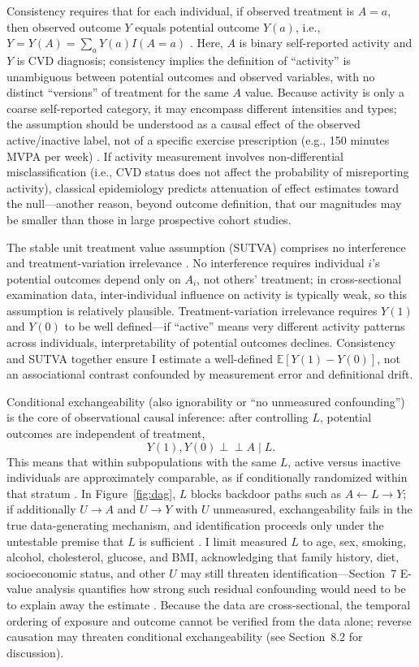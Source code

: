 \documentclass[12pt,a4paper]{article}
\newcommand{\E}{\mathbb{E}}
\newcommand{\indep}{\perp\!\!\!\perp}
\begin{document}
Consistency requires that for each individual, if observed treatment is $A=a$, then observed outcome $Y$ equals potential outcome $Y(a)$, i.e., $Y=Y(A)=\sum_a Y(a)I(A=a)$ \cite{hernan2024whatif}. Here, $A$ is binary self-reported activity and $Y$ is CVD diagnosis; consistency implies the definition of ``activity'' is unambiguous between potential outcomes and observed variables, with no distinct ``versions'' of treatment for the same $A$ value. Because activity is only a coarse self-reported category, it may encompass different intensities and types; the assumption should be understood as a causal effect of the observed active/inactive label, not of a specific exercise prescription (e.g., 150 minutes MVPA per week) \cite{mi2025creview}. If activity measurement involves non-differential misclassification (i.e., CVD status does not affect the probability of misreporting activity), classical epidemiology predicts attenuation of effect estimates toward the null---another reason, beyond outcome definition, that our magnitudes may be smaller than those in large prospective cohort studies.

The stable unit treatment value assumption (SUTVA) comprises no interference and treatment-variation irrelevance \cite{hernan2024whatif}. No interference requires individual $i$'s potential outcomes depend only on $A_i$, not others' treatment; in cross-sectional examination data, inter-individual influence on activity is typically weak, so this assumption is relatively plausible. Treatment-variation irrelevance requires $Y(1)$ and $Y(0)$ to be well defined---if ``active'' means very different activity patterns across individuals, interpretability of potential outcomes declines. Consistency and SUTVA together ensure I estimate a well-defined $\E[Y(1)-Y(0)]$, not an associational contrast confounded by measurement error and definitional drift.

Conditional exchangeability (also ignorability or ``no unmeasured confounding'') is the core of observational causal inference: after controlling $L$, potential outcomes are independent of treatment,
\[
Y(1),Y(0)\indep A\mid L.
\]
This means that within subpopulations with the same $L$, active versus inactive individuals are approximately comparable, as if conditionally randomized within that stratum \cite{hernan2024whatif,rosenbaum1983central}. In Figure~\ref{fig:dag}, $L$ blocks backdoor paths such as $A\leftarrow L\to Y$; if additionally $U\to A$ and $U\to Y$ with $U$ unmeasured, exchangeability fails in the true data-generating mechanism, and identification proceeds only under the untestable premise that $L$ is sufficient \cite{hernan2024whatif}. I limit measured $L$ to age, sex, smoking, alcohol, cholesterol, glucose, and BMI, acknowledging that family history, diet, socioeconomic status, and other $U$ may still threaten identification---Section~7 E-value analysis quantifies how strong such residual confounding would need to be to explain away the estimate \cite{vanderweele2017evalue}. Because the data are cross-sectional, the temporal ordering of exposure and outcome cannot be verified from the data alone; reverse causation may threaten conditional exchangeability (see Section~8.2 for discussion).
\end{document}
